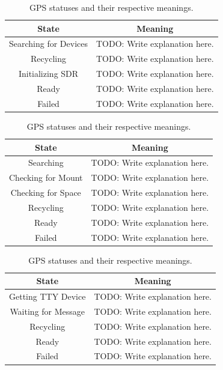 \documentclass{report}
\begin{document}
			\begin{table}[htb]
			\centering
			\caption{SDR statuses and their respective meanings.}
			\begin{tabular}{||c c||}
			\hline
			State & Meaning\\ [0.5ex]
			\hline\hline
			Searching for Devices & TODO: Write explanation here. \\
			\hline
			Recycling & TODO: Write explanation here.\\
			\hline
			Initializing SDR & TODO: Write explanation here. \\
			\hline
			Ready & TODO: Write explanation here.\\
			\hline
			Failed & TODO: Write explanation here.\\ [1ex]
			\hline
			\end{tabular}
			
			\caption{Directory statuses and their respective meanings.}
			\begin{tabular}{||c c||}
			\hline
			State & Meaning\\ [0.5ex]
			\hline\hline
			Searching & TODO: Write explanation here. \\
			\hline
			Checking for Mount & TODO: Write explanation here.\\
			\hline
			Checking for Space & TODO: Write explanation here. \\
			\hline
			Recycling & TODO: Write explanation here.\\
			\hline
			Ready & TODO: Write explanation here.\\
			\hline
			Failed & TODO: Write explanation here.\\ [1ex]
			\hline
			\end{tabular}
			
			\caption{GPS statuses and their respective meanings.}
			\begin{tabular}{||c c||}
			\hline
			State & Meaning\\ [0.5ex]
			\hline\hline
			Getting TTY Device & TODO: Write explanation here. \\
			\hline
			Waiting for Message & TODO: Write explanation here.\\
			\hline
			Recycling & TODO: Write explanation here. \\
			\hline
			Ready & TODO: Write explanation here.\\
			\hline
			Failed & TODO: Write explanation here.\\ [1ex]
			\hline
			\end{tabular}
			

\end{table}
\end{document}
